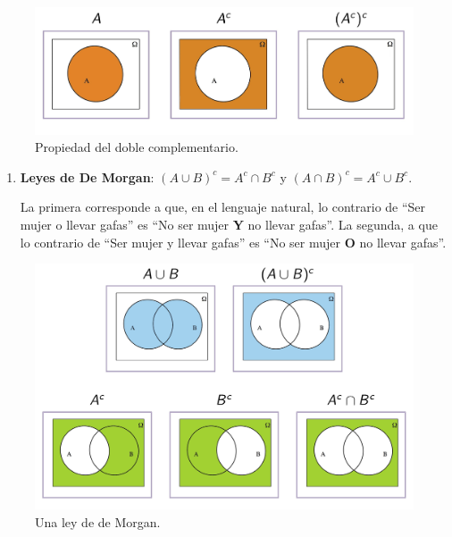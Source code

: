 \documentclass[
]{book}
\theoremstyle{definition}
\theoremstyle{definition}
\theoremstyle{definition}
\theoremstyle{definition}
\theoremstyle{remark}
\begin{document}
\begin{figure}

{\centering \includegraphics[width=0.8\linewidth]{INREMDN_files/figure-html/dcBD} 

}

\caption{Propiedad del doble complementario.}\label{fig:unnamed-chunk-91}
\end{figure}

\begin{enumerate}
\def\labelenumi{\alph{enumi}.}
\setcounter{enumi}{5}
\item
  \textbf{Leyes de De Morgan}: \((A\cup B)^c=A^c \cap B^c\) y \((A\cap B)^c=A^c\cup B^c\).

  La primera corresponde a que, en el lenguaje natural, lo contrario de ``Ser mujer o llevar gafas'' es ``No ser mujer \textbf{Y} no llevar gafas''. La segunda, a que lo contrario de ``Ser mujer y llevar gafas'' es ``No ser mujer \textbf{O} no llevar gafas''.
\end{enumerate}

\begin{figure}

{\centering \includegraphics[width=0.8\linewidth]{INREMDN_files/figure-html/dM1BD} 

}

\caption{Una ley de de Morgan.}\label{fig:unnamed-chunk-92}
\end{figure}
\end{document}
